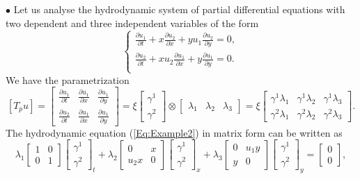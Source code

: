 \documentclass{birkjour}
\theoremstyle{definition}
\theoremstyle{remark}
\numberwithin{equation}{section}
\numberwithin{equation}{section}
\numberwithin{thm}{section}
\numberwithin{equation}{section}
\numberwithin{thm}{section}
\begin{document}
$\bullet$ Let us analyse the hydrodynamic system of partial differential equations with two dependent and three independent variables of the form
\begin{equation}\label{Eq:Example2}
	\begin{cases}
		\frac{\partial u_1}{\partial t}+x\frac{\partial u_2}{\partial x}+yu_1\frac{\partial u_2}{\partial y}=0,\\
		\frac{\partial u_2}{\partial t}+xu_2\frac{\partial u_1}{\partial x}+y\frac{\partial u_1}{\partial y}=0.\\
	\end{cases}
\end{equation}
We have the parametrization
$$
[T_pu]=\left[ \begin{matrix} \frac {\partial u_1} {\partial t}& \frac {\partial u_1} {\partial x}& \frac {\partial u_1} {\partial y}\\ \frac {\partial u_2} {\partial t}& \frac {\partial u_1} {\partial x}& \frac {\partial u_1} {\partial y}\end{matrix} \right] =\xi \left[ \begin{matrix} \gamma^{1}\\ \gamma^{2}\end{matrix} \right] \otimes \left[ \begin{matrix} \lambda _{1}& \lambda _{2}& \lambda _{3}\end{matrix} \right] =\xi \left[ \begin{matrix} \gamma^{1}\lambda _{1}& \gamma ^{1}\lambda _{2}& \gamma^{1}\lambda _{3}\\ \gamma ^{2}\lambda _{1}& \gamma ^{2}\lambda_{2}& \gamma^{2}\lambda _{3}\end{matrix} \right].$$
The hydrodynamic equation (\ref{Eq:Example2}) in matrix form can be written as
$$
\lambda_{1}\left[\begin{array}{cc} 1& 0\\ 
	0& 1\end{array} \right] \left[ \begin{array}{c} \gamma^1\\ \gamma^2\end{array} \right] _{t}+\lambda _{2}\left[ \begin{array}{cc} 0&x\\u_2x& 0 \end{array} \right] \left[\begin{array}{c} \gamma^1\\ \gamma^2\end{array}\right] _{x}+\lambda_3\left[ \begin{matrix} 0& u_1y\\ y& 0\end{matrix} \right] \left[ \begin{array}{c} \gamma^1\\ \gamma^2\end{array} \right]_y =\left[ \begin{matrix} 0\\ 0\end{matrix} \right],
$$
\end{document}
